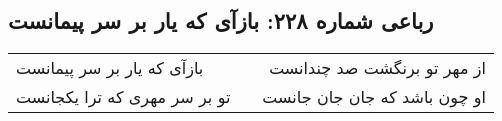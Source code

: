 \begin{center}
\section*{رباعی شماره ۲۲۸: بازآی که یار بر سر پیمانست}
\label{sec:0228}
\begin{longtable}{l p{0.5cm} r}
بازآی که یار بر سر پیمانست
&&
از مهر تو برنگشت صد چندانست
\\
تو بر سر مهری که ترا یکجانست
&&
او چون باشد که جان جان جانست
\\
\end{longtable}
\end{center}
